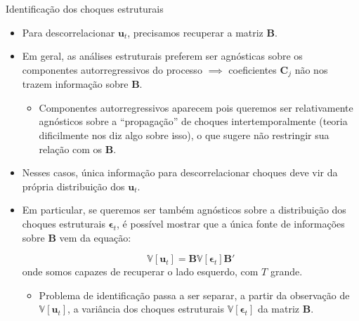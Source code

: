 \documentclass[11pt]{beamer}
\begin{document}
\begin{frame}{Identificação dos choques estruturais}
	\begin{itemize}
		\item Para descorrelacionar $\boldsymbol{u}_t$, precisamos recuperar a matriz $\boldsymbol{B}$.
		\item Em geral, as análises estruturais preferem ser agnósticas sobre os componentes autorregressivos do processo $\implies$ coeficientes $\boldsymbol{C}_j$ não nos trazem informação sobre $\boldsymbol{B}$.
		\begin{itemize}
			\item Componentes autorregressivos aparecem pois queremos ser relativamente agnósticos sobre a ``propagação'' de choques intertemporalmente (teoria dificilmente nos diz algo sobre isso), o que sugere não restringir sua relação com os $\boldsymbol{B}$.
		\end{itemize}
		\item Nesses casos, única informação para descorrelacionar choques deve vir da própria distribuição dos $\boldsymbol{u}_t$.
		\item Em particular, se queremos ser também agnósticos sobre a distribuição dos choques estruturais $\boldsymbol{\epsilon}_t$, é possível mostrar que a única fonte de informações sobre $\boldsymbol{B}$ vem da equação:
		
		$$\mathbb{V}[\boldsymbol{u}_t] = \boldsymbol{B}\mathbb{V}[\boldsymbol{\epsilon}_t] \boldsymbol{B}'$$
		onde somos capazes de recuperar o lado esquerdo, com $T$ grande.
		\begin{itemize}
			\item Problema de identificação passa a ser separar, a partir da observação de $\mathbb{V}[\boldsymbol{u}_t]$, a variância dos choques estruturais $\mathbb{V}[\boldsymbol{\epsilon}_t]$ da matriz $\boldsymbol{B}$.
		\end{itemize}
	\end{itemize}
\end{frame}
\end{document}

